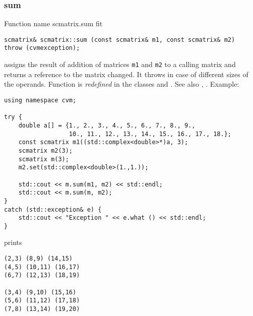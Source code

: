 \subsubsection{sum}
Function%
\pdfdest name {scmatrix.sum} fit
\begin{verbatim}
scmatrix& scmatrix::sum (const scmatrix& m1, const scmatrix& m2)
throw (cvmexception);
\end{verbatim}
assigns the result of addition of
matrices \verb"m1" and \verb"m2"  to a calling matrix
and returns a reference to
the matrix changed.
It throws  
in case of different sizes of the operands.
Function is \emph{redefined} in the classes
and .
See also ,
.
Example:
\begin{Verbatim}
using namespace cvm;

try {
    double a[] = {1., 2., 3., 4., 5., 6., 7., 8., 9.,
                  10., 11., 12., 13., 14., 15., 16., 17., 18.};
    const scmatrix m1((std::complex<double>*)a, 3);
    scmatrix m2(3);
    scmatrix m(3);
    m2.set(std::complex<double>(1.,1.));

    std::cout << m.sum(m1, m2) << std::endl;
    std::cout << m.sum(m, m2);
}
catch (std::exception& e) {
    std::cout << "Exception " << e.what () << std::endl;
}
\end{Verbatim}
prints
\begin{Verbatim}
(2,3) (8,9) (14,15)
(4,5) (10,11) (16,17)
(6,7) (12,13) (18,19)

(3,4) (9,10) (15,16)
(5,6) (11,12) (17,18)
(7,8) (13,14) (19,20)
\end{Verbatim}
\newpage



